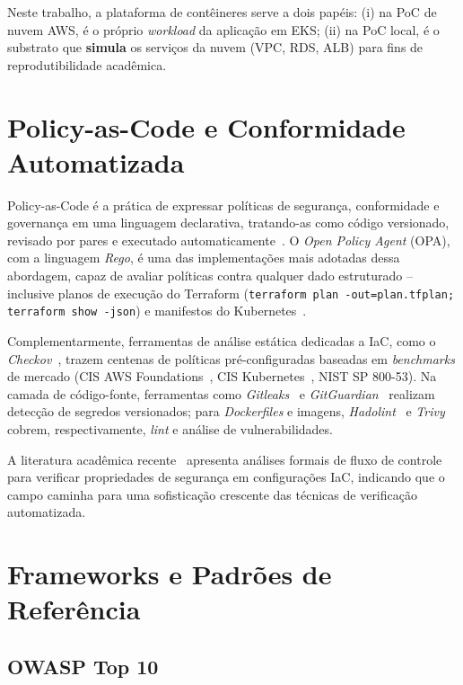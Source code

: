 Neste trabalho, a plataforma de contêineres serve a dois papéis: (i) na PoC de nuvem AWS, é o próprio \textit{workload} da aplicação em EKS; (ii) na PoC local, é o substrato que \textbf{simula} os serviços da nuvem (VPC, RDS, ALB) para fins de reprodutibilidade acadêmica.

\section{Policy-as-Code e Conformidade Automatizada}

Policy-as-Code é a prática de expressar políticas de segurança, conformidade e governança em uma linguagem declarativa, tratando-as como código versionado, revisado por pares e executado automaticamente~. O \textit{Open Policy Agent} (OPA), com a linguagem \textit{Rego}, é uma das implementações mais adotadas dessa abordagem, capaz de avaliar políticas contra qualquer dado estruturado -- inclusive planos de execução do Terraform (\texttt{terraform plan -out=plan.tfplan; terraform show -json}) e manifestos do Kubernetes~.

Complementarmente, ferramentas de análise estática dedicadas a IaC, como o \textit{Checkov}~, trazem centenas de políticas pré-configuradas baseadas em \textit{benchmarks} de mercado (CIS AWS Foundations~, CIS Kubernetes~, NIST SP 800-53). Na camada de código-fonte, ferramentas como \textit{Gitleaks}~ e \textit{GitGuardian}~ realizam detecção de segredos versionados; para \textit{Dockerfiles} e imagens, \textit{Hadolint}~ e \textit{Trivy}~ cobrem, respectivamente, \textit{lint} e análise de vulnerabilidades.

A literatura acadêmica recente~ apresenta análises formais de fluxo de controle para verificar propriedades de segurança em configurações IaC, indicando que o campo caminha para uma sofisticação crescente das técnicas de verificação automatizada.

\section{Frameworks e Padrões de Referência}

\subsection{OWASP Top 10}

